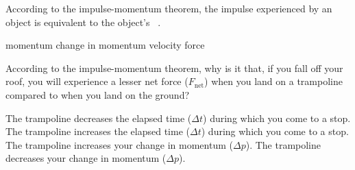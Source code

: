 \documentclass[]{exam}
\begin{document}
\begin{questions}
\question
According to the impulse-momentum theorem, the impulse experienced by an object is equivalent to the object's \fillin\ .

\begin{randomizechoices}
\choice momentum
\correctchoice change in momentum
\choice velocity
\choice force
\end{randomizechoices}





\question
According to the impulse-momentum theorem, why is it that, if you fall off your roof, you will experience a lesser net force ($F_{\text{net}}$) when you land on a trampoline compared to when you land on the ground?

\begin{randomizechoices}
\choice The trampoline decreases the elapsed time ($\Delta t$) during which you come to a stop.
\correctchoice The trampoline increases the elapsed time ($\Delta t$) during which you come to a stop.
\choice The trampoline increases your change in momentum ($\Delta p$).
\choice The trampoline decreases your change in momentum ($\Delta p$).
\end{randomizechoices}




\end{questions}
\end{document}
